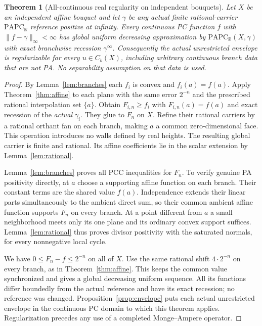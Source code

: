 \documentclass[11pt]{article}
\newtheorem{theorem}{Theorem}[section]
\theoremstyle{definition}\newtheorem{definition}[theorem]{Definition}
\theoremstyle{remark}\newtheorem{remark}[theorem]{Remark}
\newcommand{\R}{\mathbb R}\newcommand{\Q}{\mathbb Q}\newcommand{\Z}{\mathbb Z}
\newcommand{\PAPC}{\mathrm{PAPC}}\newcommand{\epi}{\operatorname{epi}}
\begin{document}
\begin{theorem}[All-continuous real regularity on independent bouquets]\label{thm:bouquet}
Let $X$ be an independent affine bouquet and let $\gamma$ be any actual finite rational-carrier $\PAPC_\R$ reference positive at infinity. Every continuous PC function $f$ with $\|f-\gamma\|_\infty<\infty$ has global uniform decreasing approximation by $\PAPC_\R(X,\gamma)$ with exact branchwise recession $\gamma^\infty$. Consequently the actual unrestricted envelope is regularizable for every $u\in C_b(X)$, including arbitrary continuous branch data that are not PA. No separability assumption on that data is used.
\end{theorem}
\begin{proof}
By Lemma~\ref{lem:branches} each $f_i$ is convex and $f_i(a)=f(a)$. Apply Theorem~\ref{thm:affine} to each plane with the same error $2^{-n}$ and the prescribed rational interpolation set $\{a\}$. Obtain $F_{i,n}\geq f_i$ with $F_{i,n}(a)=f(a)$ and exact recession of the \emph{actual} $\gamma_i$. They glue to $F_n$ on $X$. Refine their rational carriers by a rational orthant fan on each branch, making $a$ a common zero-dimensional face. This operation introduces no walls defined by real heights. The resulting global carrier is finite and rational. Its affine coefficients lie in the scalar extension by Lemma~\ref{lem:rational}.

Lemma~\ref{lem:branches} proves all PCC inequalities for $F_n$. To verify genuine PA positivity directly, at $a$ choose a supporting affine function on each branch. Their constant terms are the shared value $f(a)$. Independence extends their linear parts simultaneously to the ambient direct sum, so their common ambient affine function supports $F_n$ on every branch. At a point different from $a$ a small neighborhood meets only its one plane and its ordinary convex support suffices. Lemma~\ref{lem:rational} thus proves divisor positivity with the saturated normals, for every nonnegative local cycle.

We have $0\leq F_n-f\leq2^{-n}$ on all of $X$. Use the same rational shift $4\cdot2^{-n}$ on every branch, as in Theorem~\ref{thm:affine}. This keeps the common value synchronized and gives a global decreasing uniform sequence. All its functions differ boundedly from the actual reference and have its exact recession; no reference was changed. Proposition~\ref{prop:envelope} puts each actual unrestricted envelope in the continuous PC domain to which this theorem applies. Regularization precedes any use of a completed Monge--Ampere operator.
\end{proof}
\end{document}
